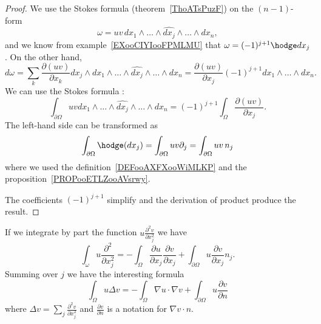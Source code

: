 \begin{proof}
	We use the Stokes formula (theorem~\ref{ThoATsPuzF}) on the \( (n-1)\)-form
	\begin{equation}
		\omega=uv\,dx_1\wedge\ldots\wedge\widehat{dx_j}\wedge\ldots\wedge dx_n,
	\end{equation}
	and we know from example~\ref{EXooCIYIooFPMLMU} that \( \omega=(-1)^{j+1}\hodge dx_j\). On the other hand,
	\begin{equation}
		d\omega=\sum_k\frac{ \partial (uv) }{ \partial x_k }dx_j\wedge dx_1\wedge\ldots\wedge\widehat{dx_j}\wedge\ldots\wedge dx_n=\frac{ \partial (uv) }{ \partial x_j }(-1)^{j+1}dx_1\wedge\ldots\wedge dx_n.
	\end{equation}
	We can use the Stokes formula :
	\begin{equation}
		\int_{\partial \Omega} uv dx_1\wedge\ldots\wedge\widehat{dx_j}\wedge\ldots\wedge dx_n=  (-1)^{j+1} \int_{\Omega}\frac{ \partial (uv) }{ \partial x_j }.
	\end{equation}
	The left-hand side can be transformed as
	\begin{equation}
		\int_{\partial\Omega}\hodge(dx_j)=\int_{\partial\Omega}uv\partial_j=\int_{\partial\Omega}uv\,n_j
	\end{equation}
	where we used the definition~\ref{DEFooAXFXooWiMLKP} and the proposition~\ref{PROPooETLZooAVsrwy}.

	The coefficients \( (-1)^{j+1}\) simplify and the derivation of product produce the result.
\end{proof}

\begin{example}     \label{EXooWLUVooNamnKG}
	If we integrate by part the function \( u\frac{ \partial^2 v }{ \partial x_j^2 }\) we have
	\begin{equation}
		\int_{\omega}u\frac{ \partial^2 }{ \partial x_j^2 }=-\int_{\Omega}\frac{ \partial u }{ \partial x_j }\frac{ \partial v }{ \partial x_j }+\int_{\partial \Omega}u\frac{ \partial v }{ \partial x_j }n_j.
	\end{equation}
	Summing over \( j\) we have the interesting formula
	\begin{equation}        \label{EQooJLDTooIMtxEX}
		\int_{\Omega}u\Delta v=-\int_{\Omega}\nabla u\cdot\nabla v+\int_{\partial \Omega}u\frac{ \partial v }{ \partial n }
	\end{equation}
	where \( \Delta v=\sum_j\frac{ \partial^2v }{ \partial x_j^2 }\) and \( \frac{ \partial v }{ \partial n }\) is a notation for \( \nabla v\cdot n\).
\end{example}
